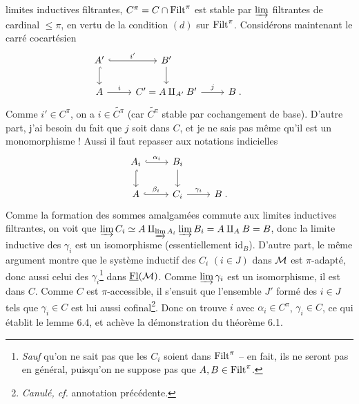 limites inductives filtrantes, $C^{\pi} = C \cap \mathrm{Filt}^{\pi}$ est stable par $\varinjlim$ filtrantes de cardinal $\leq \pi$, en vertu de la condition $(d)$ sur $\mathrm{Filt}^{\pi}$. Considérons maintenant le carré cocartésien
\[
\begin{tikzcd}
A' \arrow[r, hook, "i'"] \arrow[d, hook] & B' \arrow[d] & & \\
A \arrow[r, "i"] & C' = A \amalg_{A'} B' \arrow[r, "j"] & B \;.
\end{tikzcd}
\]
Comme $i' \in C^{\pi}$, on a $i \in \widetilde{C^{\pi}}$ (car $\widetilde{C^{\pi}}$ stable par cochangement de base). D'autre part, j'ai besoin du fait que $j$ soit dans $C$, et je ne sais pas même qu'il est un monomorphisme ! Aussi il faut repasser aux notations indicielles
\[
\begin{tikzcd}
A_i \arrow[r, hook, "\alpha_i"] \arrow[d, hook] & B_i \arrow[d] & \\
A \arrow[r, hook, "\beta_i"] & C_i \arrow[r, "\gamma_i"] & B \;.
\end{tikzcd}
\]
Comme la formation des sommes amalgamées commute aux limites inductives filtrantes, on voit que $\varinjlim C_i \simeq A \amalg_{\varinjlim A_i} \varinjlim B_i = A \amalg_A B = B$, donc la limite inductive des $\gamma_i$ est un isomorphisme (essentiellement $\mathrm{id}_B$). D'autre part, le même argument montre que le système inductif des $C_i$ $(i \in J)$ dans $\mathcal{M}$ est $\pi$-adapté, donc aussi celui des $\gamma_i$\footnote[28]{\textit{Sauf} qu'on ne sait pas que les $C_i$ soient dans $\mathrm{Filt}^{\pi}$ -- en fait, ils ne seront pas en général, puisqu'on ne suppose pas que $A, B \in \mathrm{Filt}^{\pi}$.}
dans $\underline{\mathrm{Fl}}(\mathcal{M})$. Comme $\varinjlim \gamma_i$ est un isomorphisme, il est dans $C$. Comme $C$ est $\pi$-accessible, il s'ensuit que l'ensemble $J'$ formé des $i \in J$ tels que $\gamma_i \in C$ est lui aussi cofinal\footnote[29]{\textit{Canulé, cf.} annotation précédente.}. Donc on trouve $i$ avec $\alpha_i \in C^{\pi}$, $\gamma_i \in C$, ce qui établit le lemme 6.4, et achève la démonstration du théorème 6.1.

